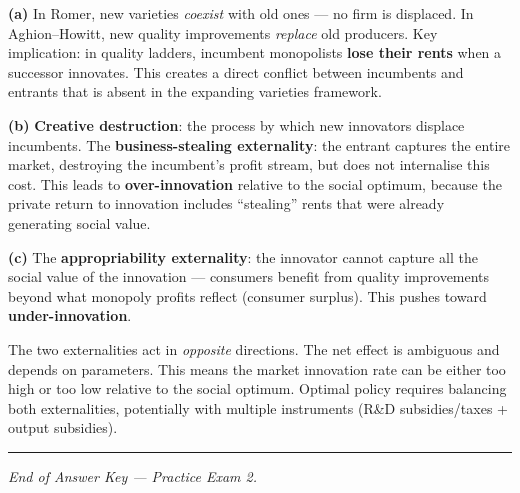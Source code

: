 \documentclass[a4paper,11pt]{article}
\begin{document}
\begin{answerbox}
\textbf{(a)} In Romer, new varieties \emph{coexist} with old ones --- no firm is displaced.
In Aghion--Howitt, new quality improvements \emph{replace} old producers.  Key implication:
in quality ladders, incumbent monopolists \textbf{lose their rents} when a successor
innovates.  This creates a direct conflict between incumbents and entrants that is absent
in the expanding varieties framework.

\textbf{(b)} \textbf{Creative destruction}: the process by which new innovators displace
incumbents.  The \textbf{business-stealing externality}: the entrant captures the entire
market, destroying the incumbent's profit stream, but does not internalise this cost.
This leads to \textbf{over-innovation} relative to the social optimum, because the private
return to innovation includes ``stealing'' rents that were already generating social value.

\textbf{(c)} The \textbf{appropriability externality}: the innovator cannot capture all
the social value of the innovation --- consumers benefit from quality improvements beyond
what monopoly profits reflect (consumer surplus).  This pushes toward
\textbf{under-innovation}.

The two externalities act in \emph{opposite} directions.  The net effect is ambiguous and
depends on parameters.  This means the market innovation rate can be either too high or
too low relative to the social optimum.  Optimal policy requires balancing both
externalities, potentially with multiple instruments (R\&D subsidies/taxes + output subsidies).
\end{answerbox}

\vspace{12pt}
\noindent\rule{\textwidth}{0.4pt}
\begin{center}\textit{End of Answer Key --- Practice Exam 2.}\end{center}
\end{document}
